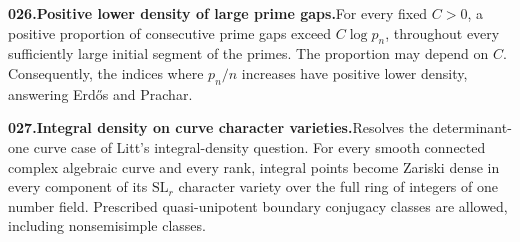 \documentclass[11pt,a4paper]{article}
\begin{document}
  \par \begin{minipage}{\linewidth}
  \fontsize{10.5}{12.6}\selectfont\RaggedRight
  \hypertarget{result 026}{}
  {\bfseries\textcolor{muted}{026.}\enspace Positive lower density of large prime gaps.}\enspace For every fixed $C>0$, a positive proportion of consecutive prime gaps exceed $C\log p_n$, throughout every sufficiently large initial segment of the primes. The proportion may depend on $C$. Consequently, the indices where $p_n/n$ increases have positive lower density, answering Erd\H{o}s and Prachar.\par
  \end{minipage}\par\vspace{5pt}



  \par \begin{minipage}{\linewidth}
  \fontsize{10.5}{12.6}\selectfont\RaggedRight
  \hypertarget{result 027}{}
  {\bfseries\textcolor{muted}{027.}\enspace Integral density on curve character varieties.}\enspace Resolves the determinant-one curve case of Litt's integral-density question. For every smooth connected complex algebraic curve and every rank, integral points become Zariski dense in every component of its $\mathrm{SL}_r$ character variety over the full ring of integers of one number field. Prescribed quasi-unipotent boundary conjugacy classes are allowed, including nonsemisimple classes.\par
  \end{minipage}\par\vspace{5pt}
\end{document}
